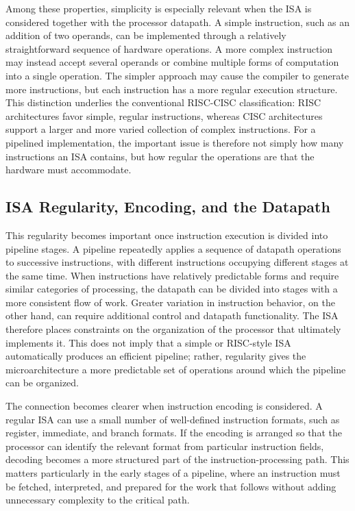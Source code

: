 \documentclass[11pt,a4paper]{report}
\begin{document}
Among these properties, simplicity is especially relevant when the ISA is considered together with the processor datapath. A simple instruction, such as an addition of two operands, can be implemented through a relatively straightforward sequence of hardware operations. A more complex instruction may instead accept several operands or combine multiple forms of computation into a single operation. The simpler approach may cause the compiler to generate more instructions, but each instruction has a more regular execution structure. This distinction underlies the conventional RISC-CISC classification: RISC architectures favor simple, regular instructions, whereas CISC architectures support a larger and more varied collection of complex instructions. For a pipelined implementation, the important issue is therefore not simply how many instructions an ISA contains, but how regular the operations are that the hardware must accommodate.~\cite{sarangi}

\subsection{ISA Regularity, Encoding, and the Datapath}

This regularity becomes important once instruction execution is divided into pipeline stages. A pipeline repeatedly applies a sequence of datapath operations to successive instructions, with different instructions occupying different stages at the same time. When instructions have relatively predictable forms and require similar categories of processing, the datapath can be divided into stages with a more consistent flow of work. Greater variation in instruction behavior, on the other hand, can require additional control and datapath functionality. The ISA therefore places constraints on the organization of the processor that ultimately implements it. This does not imply that a simple or RISC-style ISA automatically produces an efficient pipeline; rather, regularity gives the microarchitecture a more predictable set of operations around which the pipeline can be organized.

The connection becomes clearer when instruction encoding is considered. A regular ISA can use a small number of well-defined instruction formats, such as register, immediate, and branch formats. If the encoding is arranged so that the processor can identify the relevant format from particular instruction fields, decoding becomes a more structured part of the instruction-processing path. This matters particularly in the early stages of a pipeline, where an instruction must be fetched, interpreted, and prepared for the work that follows without adding unnecessary complexity to the critical path.
\end{document}
